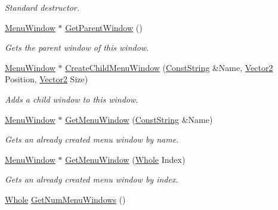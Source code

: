 \begin{DoxyCompactItemize}
\begin{DoxyCompactList}\small\item\em Standard destructor. \item\end{DoxyCompactList}\item 
\hyperlink{classphys_1_1UI_1_1MenuWindow}{MenuWindow} $\ast$ \hyperlink{classphys_1_1UI_1_1MenuWindow_ac47ccc564f09ac33e13e56860b6ae281}{GetParentWindow} ()
\begin{DoxyCompactList}\small\item\em Gets the parent window of this window. \item\end{DoxyCompactList}\item 
\hyperlink{classphys_1_1UI_1_1MenuWindow}{MenuWindow} $\ast$ \hyperlink{classphys_1_1UI_1_1MenuWindow_a7540b9e25f150d18a9c348284d8daab9}{CreateChildMenuWindow} (\hyperlink{namespacephys_a5ce5049f8b4bf88d6413c47b504ebb31}{ConstString} \&Name, \hyperlink{classphys_1_1Vector2}{Vector2} Position, \hyperlink{classphys_1_1Vector2}{Vector2} Size)
\begin{DoxyCompactList}\small\item\em Adds a child window to this window. \item\end{DoxyCompactList}\item 
\hyperlink{classphys_1_1UI_1_1MenuWindow}{MenuWindow} $\ast$ \hyperlink{classphys_1_1UI_1_1MenuWindow_a534403f058e42e8f4a10a915ee26f4e6}{GetMenuWindow} (\hyperlink{namespacephys_a5ce5049f8b4bf88d6413c47b504ebb31}{ConstString} \&Name)
\begin{DoxyCompactList}\small\item\em Gets an already created menu window by name. \item\end{DoxyCompactList}\item 
\hyperlink{classphys_1_1UI_1_1MenuWindow}{MenuWindow} $\ast$ \hyperlink{classphys_1_1UI_1_1MenuWindow_a63a3941ddddbe2d30759facb2c96d93e}{GetMenuWindow} (\hyperlink{namespacephys_a460f6bc24c8dd347b05e0366ae34f34a}{Whole} Index)
\begin{DoxyCompactList}\small\item\em Gets an already created menu window by index. \item\end{DoxyCompactList}\item 
\hyperlink{namespacephys_a460f6bc24c8dd347b05e0366ae34f34a}{Whole} \hyperlink{classphys_1_1UI_1_1MenuWindow_a367dcc831a0bddee0350410b02aeec29}{GetNumMenuWindows} ()

\end{DoxyCompactItemize}
